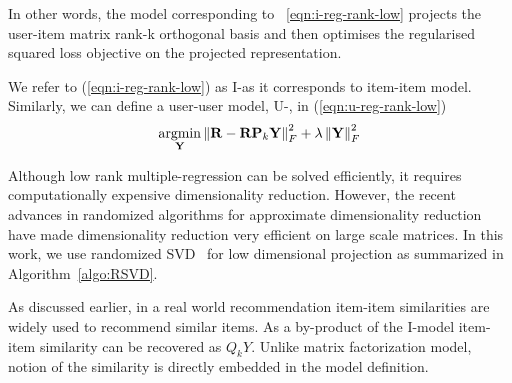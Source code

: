 In other words, the model corresponding to ~\ref{eqn:i-reg-rank-low} projects the user-item matrix rank-k orthogonal basis and then optimises the regularised squared loss objective on the projected representation.

We refer to (\ref{eqn:i-reg-rank-low}) as I-\LinearLow as it corresponds to item-item model. Similarly, we can define a user-user model, U-\LinearLow, in (\ref{eqn:u-reg-rank-low})
\begin{align}
\label{eqn:u-reg-rank-low}
\underset{\mathbf{Y}}{\mathrm{argmin}}  \left \| \mathbf{R} - \mathbf{R}\mathbf{P}_k\mathbf{Y}\right \|_F^2 + \lambda \left \|  \mathbf{Y} \right \|_F^2 
\end{align}

Although low rank multiple-regression can be solved efficiently, it requires computationally expensive dimensionality reduction. However, the recent advances in randomized algorithms for approximate dimensionality reduction~\citep{halko2011} have made dimensionality reduction very efficient on large scale matrices. In this work, we use randomized SVD~\citep{halko2011} for low dimensional projection as summarized in Algorithm~\ref{algo:RSVD}.

As discussed earlier, in a real world recommendation item-item similarities are widely used to recommend similar items. As a by-product of the I-\LinearLow model item-item similarity can be recovered as $Q_kY$. Unlike matrix factorization model, notion of the similarity is directly embedded in the model definition.

\begin{equation*}
\end{equation*}


